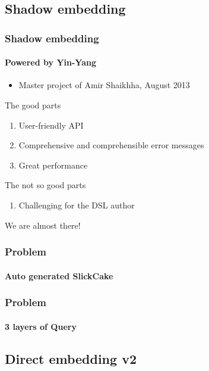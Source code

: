 \documentclass[xcolor=dvipsnames]{beamer}
\theoremstyle{definition}
\begin{document}
\subsection{Shadow embedding} %
\label{sub:Shadowembedding}
\begin{frame}[fragile]
    \frametitle{Shadow embedding}
    \framesubtitle{Powered by Yin-Yang}
    \begin{itemize}
        \item Master project of Amir Shaikhha, August 2013
    \end{itemize}
    \begin{block}{The good parts}
        \begin{enumerate}
            \item User-friendly API
            \item Comprehensive and comprehensible error messages
            \item Great performance
        \end{enumerate}
    \end{block}
    \begin{block}{The not so good parts}
        \begin{enumerate}
            \item Challenging for the DSL author
        \end{enumerate}
    \end{block}
     {
        \vspace{0.5cm}
    }
     {
        We are almost there!
    }
\end{frame}

\begin{frame}[fragile]
    \frametitle{Problem}
    \framesubtitle{Auto generated SlickCake}
    \begin{block}{}
        
    \end{block}
\end{frame}

\begin{frame}[fragile]
    \frametitle{Problem}
    \framesubtitle{3 layers of Query}
    \begin{block}{}
        
    \end{block}
\end{frame}


\subsection{Direct embedding v2} %
\label{sub:Direct embedding}
\end{document}
